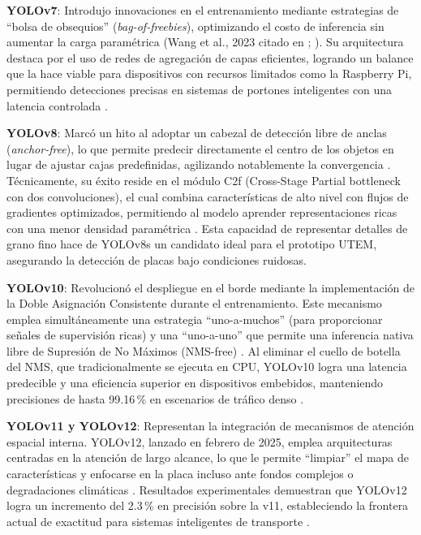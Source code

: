 \textbf{YOLOv7}: Introdujo innovaciones en el entrenamiento mediante estrategias de 
``bolsa de obsequios'' (\textit{bag-of-freebies}), optimizando el costo de inferencia sin 
aumentar la carga paramétrica 
(Wang et al., 2023 citado en \cite{mobeenRealTimeAutomaticLicense2026}; \cite{wijayaEfficientLicensePlate2024}). 
Su arquitectura destaca por el uso de redes de agregación de capas eficientes, logrando 
un balance que la hace viable para dispositivos con recursos limitados como la Raspberry Pi, 
permitiendo detecciones precisas en sistemas de portones inteligentes con una latencia controlada 
\parencite{wijayaEfficientLicensePlate2024}.

\textbf{YOLOv8}: Marcó un hito al adoptar un cabezal de detección libre de anclas 
(\textit{anchor-free}), lo que permite predecir directamente el centro de los objetos en 
lugar de ajustar cajas predefinidas, agilizando notablemente la convergencia 
\parencite{mobeenRealTimeAutomaticLicense2026, YOLOv10VsYOLOv82025}. 
Técnicamente, su éxito reside en el módulo C2f (Cross-Stage Partial bottleneck con dos 
convoluciones), el cual combina características de alto nivel con flujos de gradientes 
optimizados, permitiendo al modelo aprender representaciones ricas con una menor 
densidad paramétrica 
\parencite{mobeenRealTimeAutomaticLicense2026, YOLOv10VsYOLOv82025}. 
Esta capacidad de representar detalles de grano fino hace de YOLOv8s un candidato ideal 
para el prototipo UTEM, asegurando la detección de placas bajo condiciones ruidosas.

\textbf{YOLOv10}: Revolucionó el despliegue en el borde mediante la implementación de 
la Doble Asignación Consistente durante el entrenamiento. Este mecanismo emplea 
simultáneamente una estrategia ``uno-a-muchos'' (para proporcionar señales de supervisión 
ricas) y una ``uno-a-uno'' que permite una inferencia nativa libre de Supresión de No 
Máximos (NMS-free) 
\parencite{PDFRealTimeLicense2026, YOLOv8VsYOLOv102025, YOLOv10VsYOLOv82025}. 
Al eliminar el cuello de botella del NMS, que tradicionalmente se ejecuta en CPU, 
YOLOv10 logra una latencia predecible y una eficiencia superior en dispositivos embebidos, 
manteniendo precisiones de hasta 99.16\,\% en escenarios de tráfico denso 
\parencite{meesadAdvancedDeepLearning2025a}.

\textbf{YOLOv11 y YOLOv12}: Representan la integración de mecanismos de atención espacial 
interna. YOLOv12, lanzado en febrero de 2025, emplea arquitecturas centradas en la atención 
de largo alcance, lo que le permite ``limpiar'' el mapa de características y enfocarse en la 
placa incluso ante fondos complejos o degradaciones climáticas 
\parencite{buleuDeepLearningBasedSystem2025a, suhartoComparativeEvaluationYOLObased2025}. 
Resultados experimentales demuestran que YOLOv12 logra un incremento del 2.3\,\% en 
precisión sobre la v11, estableciendo la frontera actual de exactitud para sistemas 
inteligentes de transporte \parencite{buleuDeepLearningBasedSystem2025a}.

